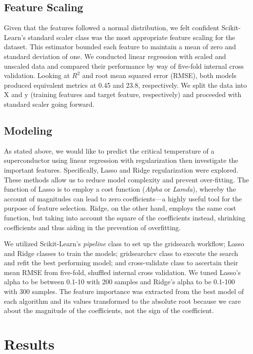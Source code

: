 \documentclass[twoside,twocolumn]{article}
\begin{document}
\subsection{Feature Scaling}
Given that the features followed a normal distribution, we felt confident Scikit-Learn’s standard scaler class was the most appropriate feature scaling for the dataset. This estimator bounded each feature to maintain a mean of zero and standard deviation of one. We conducted linear regression with scaled and unscaled data and compared their performance by way of five-fold internal cross validation. Looking at $R^{2}$ and root mean squared error (RMSE), both models produced equivalent metrics at 0.45 and 23.8, respectively. We split the data into X and y (training features and target feature, respectively) and proceeded with standard scaler going forward.

\subsection{Modeling}
As stated above, we would like to predict the critical temperature of a superconductor using linear regression with regularization then investigate the important features. Specifically, Lasso and Ridge regularization were explored. These methods allow us to reduce model complexity and prevent over-fitting. The function of Lasso is to employ a cost function (\emph{Alpha} or \emph{Lamda}), whereby the account of magnitudes can lead to zero coefficients---a highly useful tool for the purpose of feature selection. Ridge, on the other hand, employs the same cost function, but taking into account the square of the coefficients instead, shrinking coefficients and thus aiding in the prevention of overfitting.

We utilized Scikit-Learn’s \emph{pipeline} class to set up the gridsearch workflow; Lasso and Ridge classes to train the models; gridsearchcv class to execute the search and refit the best performing model; and cross-validate class to ascertain their mean RMSE from five-fold, shuffled internal cross validation. We tuned Lasso’s alpha to be between 0.1-10 with 200 samples and Ridge’s alpha to be 0.1-100 with 300 samples. The feature importance was extracted from the best model of each algorithm and its values transformed to the absolute root because we care about the magnitude of the coefficients, not the sign of the coefficient.



\section{Results}
\end{document}
